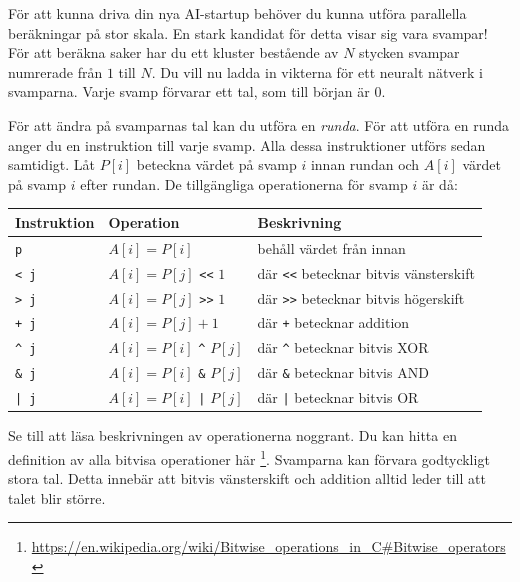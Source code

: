 \noindent


För att kunna driva din nya AI-startup behöver du kunna utföra parallella beräkningar på stor skala.
En stark kandidat för detta visar sig vara svampar!
För att beräkna saker har du ett kluster bestående av $N$ stycken svampar numrerade från $1$ till $N$.
Du vill nu ladda in vikterna för ett neuralt nätverk i svamparna.
Varje svamp förvarar ett tal, som till början är $0$.

För att ändra på svamparnas tal kan du utföra en \textit{runda}.
För att utföra en runda anger du en instruktion till varje svamp.
Alla dessa instruktioner utförs sedan samtidigt.
Låt $P[i]$ beteckna värdet på svamp $i$ innan rundan och $A[i]$ värdet på svamp $i$ efter rundan.
De tillgängliga operationerna för svamp $i$ är då:
\begin{table}[h!]\centering
\begin{tabular}{l p{3cm} l}
\textbf{Instruktion} & \textbf{Operation} & \textbf{Beskrivning} \\ \hline
\texttt{p}       & $A[i] = P[i]$ & behåll värdet från innan \\
\texttt{< j}     & $A[i] = P[j]$ \texttt{<<} $1$ & där \texttt{<<} betecknar bitvis vänsterskift \\
\texttt{> j}     & $A[i] = P[j]$ \texttt{>>} $1$ & där \texttt{>>} betecknar bitvis högerskift \\
\texttt{+ j}     & $A[i] = P[j] + 1$ & där \texttt{+} betecknar addition \\
\texttt{\^{} j}  & $A[i] = P[i]$ \texttt{\^} $P[j]$ & där \texttt{\^} betecknar bitvis XOR \\
\texttt{\& j}    & $A[i] = P[i]$ \texttt{\&} $P[j]$ & där \texttt{\&} betecknar bitvis AND \\
\texttt{| j}     & $A[i] = P[i]$ \texttt{|} $P[j]$ & där \texttt{|} betecknar bitvis OR \\
\end{tabular}
\end{table}


Se till att läsa beskrivningen av operationerna noggrant. Du kan hitta en definition av alla bitvisa operationer här
\footnote{\href{https://en.wikipedia.org/wiki/Bitwise\_operations\_in\_C\#Bitwise\_operators}{https://en.wikipedia.org/wiki/Bitwise\_operations\_in\_C\#Bitwise\_operators}}.
Svamparna kan förvara godtyckligt stora tal.
Detta innebär att bitvis vänsterskift och addition alltid leder till att talet blir större.

